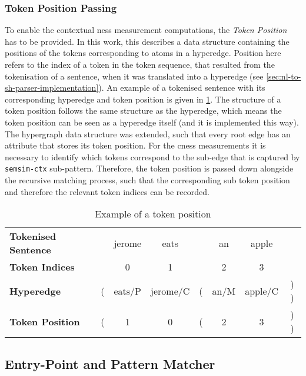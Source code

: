 \documentclass[11pt, numbers=noenddot]{scrreprt}
\begin{document}
\subsubsection{Token Position Passing}
To enable the contextual \gls{ness} measurement computations, the \textit{Token Position} has to be provided. In this work, this describes a data structure containing the positions of the tokens corresponding to atoms in a hyperedge. Position here refers to the index of a token in the token sequence, that resulted from the tokenisation of a sentence, when it was translated into a hyperedge (see \cref{sec:nl-to-sh-parser-implementation}). An example of a tokenised sentence with its corresponding hyperedge and token position is given in \cref{tab:example-token-position}. 
The structure of a token position follows the same structure as the hyperedge, which means the token position can be seen as a hyperedge itself (and it is implemented this way). The hypergraph data structure was extended, such that every root edge has an attribute that stores its token position. For the \gls{cness} measurements it is necessary to identify which tokens correspond to the sub-edge that is captured by \texttt{semsim-ctx} sub-pattern. Therefore, the token position is passed down alongside the recursive matching process, such that the corresponding sub token position and therefore the relevant token indices can be recorded. 


\begin{table}
\centering
\begin{tabular}{lccccccc}

\textbf{Tokenised Sentence} &	  & jerome & eats &  & an & apple & \\
\textbf{Token Indices} &	  & 0	& 1 & & 2 & 3 & \\

	  \midrule

\textbf{Hyperedge} &	  ( & \textsf{eats/P} & \textsf{jerome/C} & ( & \textsf{an/M}  & \textsf{apple/C} & ) ) \\
\textbf{Token Position} & 	  ( & 1 & 0 & ( & 2 & 3 & ) )
\end{tabular}	
\caption{Example of a token position}
\label{tab:example-token-position}
\end{table}

 
\subsection{Entry-Point and Pattern Matcher} 
 
\end{document}

